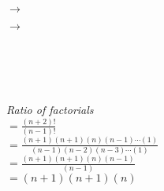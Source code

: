 \documentclass{article}
\begin{document}
        \hrulefill \\[10pt]


            $\rightarrow$


            $\rightarrow$


            \hrulefill \\[10pt]

    \\

    \hrulefill \\[10pt]

    \\[5pt]
    \textit{Ratio of factorials}\\[15pt]

    $=\frac{(n+2)!}{(n-1)!}$\\[15pt]
    
    $= \frac{(n+1)(n+1)(n)(n-1)\cdots(1)}{(n-1)(n-2)(n-3)\cdots(1)}$\\[15pt]
    
    $= \frac{(n+1)(n+1)(n)(n-1)}{(n-1)}$\\[15pt]

    $= {(n+1)(n+1)(n)}$\\[15pt]
\end{document}
